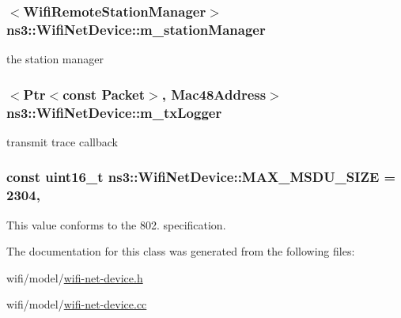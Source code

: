 \subsubsection[{\texorpdfstring{m\+\_\+station\+Manager}{m_stationManager}}]{$<${\bf Wifi\+Remote\+Station\+Manager}$>$ ns3\+::\+Wifi\+Net\+Device\+::m\+\_\+station\+Manager\hspace{0.3cm}{\ttfamily [private]}}\hypertarget{classns3_1_1WifiNetDevice_a9d7aa80a952acbbc8485bd26479c6014}{}\label{classns3_1_1WifiNetDevice_a9d7aa80a952acbbc8485bd26479c6014}


the station manager 

\subsubsection[{\texorpdfstring{m\+\_\+tx\+Logger}{m_txLogger}}]{$<${\bf Ptr}$<$const {\bf Packet}$>$, {\bf Mac48\+Address}$>$ ns3\+::\+Wifi\+Net\+Device\+::m\+\_\+tx\+Logger\hspace{0.3cm}{\ttfamily [private]}}\hypertarget{classns3_1_1WifiNetDevice_a59c4566f20a0a4d78cd6e1ec90ea9b5e}{}\label{classns3_1_1WifiNetDevice_a59c4566f20a0a4d78cd6e1ec90ea9b5e}


transmit trace callback 

\subsubsection[{\texorpdfstring{M\+A\+X\+\_\+\+M\+S\+D\+U\+\_\+\+S\+I\+ZE}{MAX_MSDU_SIZE}}]{\setlength{\rightskip}{0pt plus 5cm}const uint16\+\_\+t ns3\+::\+Wifi\+Net\+Device\+::\+M\+A\+X\+\_\+\+M\+S\+D\+U\+\_\+\+S\+I\+ZE = 2304\hspace{0.3cm}{\ttfamily [static]}, {\ttfamily [private]}}\hypertarget{classns3_1_1WifiNetDevice_a44ed8fe233665265e6c516b807d8c2e9}{}\label{classns3_1_1WifiNetDevice_a44ed8fe233665265e6c516b807d8c2e9}


This value conforms to the 802. specification. 



The documentation for this class was generated from the following files\+:\begin{DoxyCompactItemize}
\item 
wifi/model/\hyperlink{wifi-net-device_8h}{wifi-\/net-\/device.\+h}\item 
wifi/model/\hyperlink{wifi-net-device_8cc}{wifi-\/net-\/device.\+cc}\end{DoxyCompactItemize}
